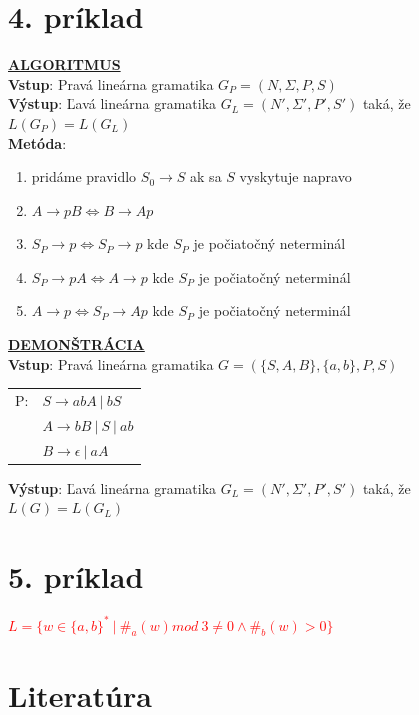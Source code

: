 \documentclass[11pt,a4paper]{article}
\newcommand{\red}[1]{\textcolor{red}{#1}}
\begin{document}
\section{4. príklad}

\underline{\textbf{\large{ALGORITMUS}}}\\[0.3em]
\textbf{Vstup}: Pravá lineárna gramatika $G_P = (N,\Sigma,P,S)$\\
\textbf{Výstup}: Ľavá lineárna gramatika $G_L = (N',\Sigma',P',S')$ taká, že $L(G_P)=L(G_L)$\\
\textbf{Metóda}:\\[-2em]
\begin{displayquote}
    \begin{enumerate}[1.)]
        \item pridáme pravidlo $S_0 \rightarrow S$  ak sa $S$ vyskytuje napravo
        \item $A   \rightarrow pB \Longleftrightarrow B   \rightarrow Ap$
        \item $S_P \rightarrow p  \Longleftrightarrow S_P \rightarrow p $ kde $S_P$ je počiatočný neterminál
        \item $S_P \rightarrow pA \Longleftrightarrow A   \rightarrow p $ kde $S_P$ je počiatočný neterminál
        \item $A   \rightarrow p  \Longleftrightarrow S_P \rightarrow Ap$ kde $S_P$ je počiatočný neterminál
    \end{enumerate}
\end{displayquote}

\hfill

\underline{\textbf{\large{DEMONŠTRÁCIA}}}\\[0.3em]
\textbf{Vstup}: Pravá lineárna gramatika $G = (\{S,A,B\}, \{a, b\}, P, S)$\\[-1.25em]
\begin{center}
\begin{tabular}{ll}
P:&$S \rightarrow abA\ |\ bS$\\
&$A \rightarrow bB\ |\ S\ |\ ab$\\
&$B \rightarrow \epsilon\ |\ aA$\\
\end{tabular}
\end{center}
\textbf{Výstup}: Ľavá lineárna gramatika $G_L = (N',\Sigma',P',S')$ taká, že $L(G)=L(G_L)$\\


\section{5. príklad}
\red{$L = \{ w \in \{a,b\}^*\ |\ \#_a(w)mod\ 3 \neq 0 \wedge \#_b(w) > 0\}$}
\newpage

\section{Literatúra}

\begin{flushleft}
    
\end{flushleft}
\end{document}
